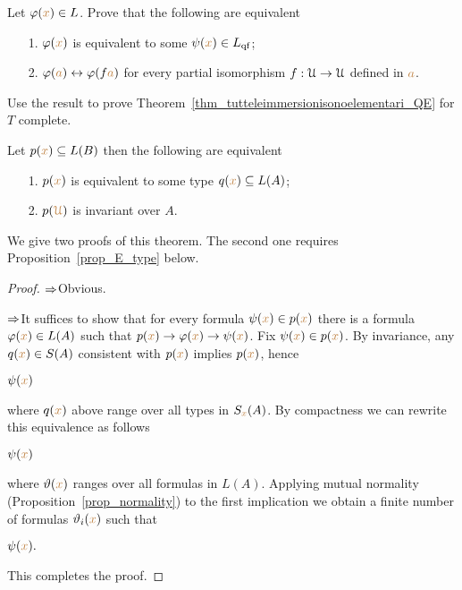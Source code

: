 \documentclass[creche.tex]{subfiles}
\begin{document}
\begin{exercise}\label{ex_qe_in_U}
Let $\varphi({\color{brown} x})\in L$. Prove that the following are equivalent
\begin{itemize}
 \item[1.] $\varphi({\color{brown} x})$ is equivalent to some $\psi({\color{brown} x})\in L_{\rm qf}$;
 \item[2.] $\varphi({\color{brown} a})\leftrightarrow \varphi(f{\color{brown} a})$ for every partial isomorphism $f:\EuScript U\to\EuScript U$ defined in ${\color{brown} a}$.
\end{itemize}
Use the result to prove Theorem~\ref{thm_tutteleimmersionisonoelementari_QE} for $T$ complete.\QED
\end{exercise}


\begin{proposition}\label{prop_inv_types}
Let $p({\color{brown} x})\subseteq L(B)$ then the following are equivalent
\begin{itemize}
 \item[1.] $p({\color{brown} x})$ is equivalent to some type $q({\color{brown} x})\subseteq L(A)$;
 \item[2.] $p({\color{brown}\EuScript U})$ is invariant over $A$.
\end{itemize}
\end{proposition}

We give two proofs of this theorem.  The second one requires Proposition~\ref{prop_E_type} below.

\begin{proof}
$\Rightarrow$\quad Obvious. 

$\Rightarrow$\quad It suffices to show that for every formula $\psi({\color{brown} x})\in p({\color{brown} x})$ there is a formula $\varphi({\color{brown} x})\in L(A)$ such that $p({\color{brown} x})\rightarrow\varphi({\color{brown} x})\rightarrow\psi({\color{brown} x})$. Fix $\psi({\color{brown} x})\in p({\color{brown} x})$. By invariance, any $q({\color{brown} x})\in S(A)$ consistent with $p({\color{brown} x})$ implies $p({\color{brown} x})$, hence

\medrel{\imp}$\psi({\color{brown} x})$

where $q({\color{brown} x})$ above range over all types in $S_{\color{brown} x}(A)$. By compactness we can rewrite this equivalence as follows

\medrel{\imp}$\psi({\color{brown} x})$

where $\vartheta({\color{brown} x})$ ranges over all formulas in $L(A)$. Applying mutual normality (Proposition~\ref{prop_normality}) to the first implication we obtain a finite number of formulas $\vartheta_i({\color{brown} x})$ such that 

\medrel{\imp}$\psi({\color{brown} x}).$

This completes the proof.
\end{proof}
\end{document}
